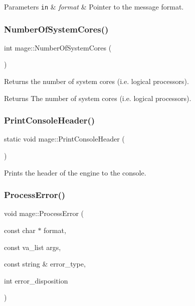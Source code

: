 \begin{DoxyParams}[1]{Parameters}
\mbox{\tt in}  & {\em format} & Pointer to the message format. \\
\hline
\end{DoxyParams}
\hypertarget{namespacemage_ab972a47121b68775bf2545b826a1d5be}{}\label{namespacemage_ab972a47121b68775bf2545b826a1d5be} 
\subsubsection{\texorpdfstring{Number\+Of\+System\+Cores()}{NumberOfSystemCores()}}
{\footnotesize\ttfamily int mage\+::\+Number\+Of\+System\+Cores (\begin{DoxyParamCaption}{ }\end{DoxyParamCaption})}

Returns the number of system cores (i.\+e. logical processors).

\begin{DoxyReturn}{Returns}
The number of system cores (i.\+e. logical processors). 
\end{DoxyReturn}
\hypertarget{namespacemage_afb64e5bf4755b0a56a7b0d086bc5f4be}{}\label{namespacemage_afb64e5bf4755b0a56a7b0d086bc5f4be} 
\subsubsection{\texorpdfstring{Print\+Console\+Header()}{PrintConsoleHeader()}}
{\footnotesize\ttfamily static void mage\+::\+Print\+Console\+Header (\begin{DoxyParamCaption}{ }\end{DoxyParamCaption})\hspace{0.3cm}{\ttfamily [static]}}

Prints the header of the engine to the console. \hypertarget{namespacemage_a958c4a88b6cd58f950e1c9b9e46f6906}{}\label{namespacemage_a958c4a88b6cd58f950e1c9b9e46f6906} 
\subsubsection{\texorpdfstring{Process\+Error()}{ProcessError()}}
{\footnotesize\ttfamily void mage\+::\+Process\+Error (\begin{DoxyParamCaption}\item[{const char $\ast$}]{format,  }\item[{const va\+\_\+list}]{args,  }\item[{const string \&}]{error\+\_\+type,  }\item[{int}]{error\+\_\+disposition }\end{DoxyParamCaption})}

